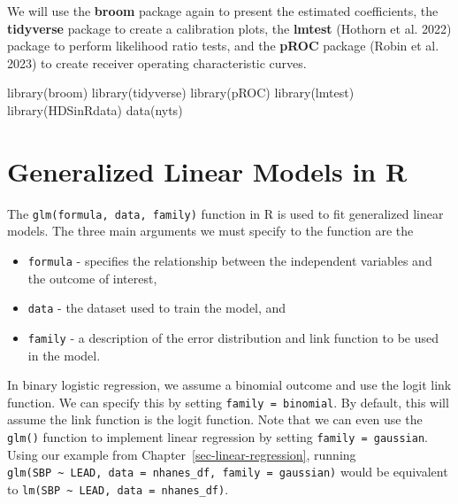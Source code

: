 \documentclass[
  letterpaper,
]{krantz}
\makeatletter
\newenvironment{Shaded}{\begin{snugshade}}{\end{snugshade}}
\newcommand{\FunctionTok}[1]{\textcolor[rgb]{0.28,0.35,0.67}{#1}}
\newcommand{\NormalTok}[1]{\textcolor[rgb]{0.00,0.23,0.31}{#1}}
\providecommand{\tightlist}{%
  \setlength{\itemsep}{0pt}\setlength{\parskip}{0pt}}\usepackage{longtable,booktabs,array}
\newenvironment{kframe}{%
\medskip{}
\setlength{\fboxsep}{.8em}
 \def\at@end@of@kframe{}%
 \ifinner\ifhmode%
  \def\at@end@of@kframe{\end{minipage}}%
  \begin{minipage}{\columnwidth}%
 \fi\fi%
 \def\FrameCommand##1{\hskip\@totalleftmargin \hskip-\fboxsep
 \colorbox{shadecolor}{##1}\hskip-\fboxsep
     \hskip-\linewidth \hskip-\@totalleftmargin \hskip\columnwidth}%
 \MakeFramed {\advance\hsize-\width
   \@totalleftmargin\z@ \linewidth\hsize
   \@setminipage}}%
 {\par\unskip\endMakeFramed%
 \at@end@of@kframe}
\renewenvironment{Shaded}{\begin{kframe}}{\end{kframe}}
\makeatother
\begin{document}
We will use the \textbf{broom} package again to present the estimated
coefficients, the \textbf{tidyverse} package to create a calibration
plots, the \textbf{lmtest} (Hothorn et al. 2022) package to perform
likelihood ratio tests, and the \textbf{pROC} package (Robin et al.
2023) to create receiver operating characteristic curves.

\begin{Shaded}
\begin{Highlighting}[]
\FunctionTok{library}\NormalTok{(broom)}
\FunctionTok{library}\NormalTok{(tidyverse)}
\FunctionTok{library}\NormalTok{(pROC)}
\FunctionTok{library}\NormalTok{(lmtest)}
\FunctionTok{library}\NormalTok{(HDSinRdata)}
\FunctionTok{data}\NormalTok{(nyts)}
\end{Highlighting}
\end{Shaded}

\section{Generalized Linear Models in
R}\label{generalized-linear-models-in-r}

The \texttt{glm(formula,\ data,\ family)} function in R is used to fit
generalized linear models. The three main arguments we must specify to
the function are the

\begin{itemize}
\tightlist
\item
  \texttt{formula} - specifies the relationship between the independent
  variables and the outcome of interest,\\
\item
  \texttt{data} - the dataset used to train the model, and\\
\item
  \texttt{family} - a description of the error distribution and link
  function to be used in the model.
\end{itemize}

In binary logistic regression, we assume a binomial outcome and use the
logit link function. We can specify this by setting
\texttt{family\ =\ binomial}. By default, this will assume the link
function is the logit function. Note that we can even use the
\texttt{glm()} function to implement linear regression by setting
\texttt{family\ =\ gaussian}. Using our example from
Chapter~\ref{sec-linear-regression}, running
\texttt{glm(SBP\ \textasciitilde{}\ LEAD,\ data\ =\ nhanes\_df,\ family\ =\ gaussian)}
would be equivalent to
\texttt{lm(SBP\ \textasciitilde{}\ LEAD,\ data\ =\ nhanes\_df)}.
\end{document}
